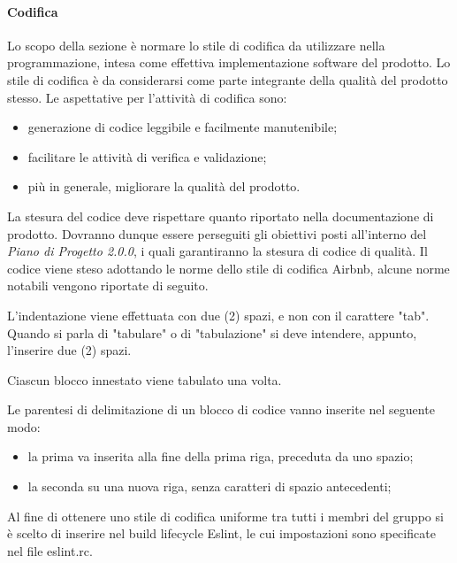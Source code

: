 		\paragraph{Codifica}
	    Lo scopo della sezione è normare lo stile di codifica da utilizzare nella programmazione, intesa come effettiva implementazione software del prodotto. Lo stile di codifica è da considerarsi come parte integrante della qualità del prodotto stesso.
	    Le aspettative per l'attività di codifica sono:
	    \begin{itemize}
	    	\item generazione di codice leggibile e facilmente manutenibile; 
	    	\item facilitare le attività di verifica e validazione;
	    	\item più in generale, migliorare la qualità del prodotto.
	    \end{itemize}
	    La stesura del codice deve rispettare quanto riportato nella documentazione di prodotto. Dovranno dunque essere perseguiti gli obiettivi posti all'interno del \textit{Piano di Progetto 2.0.0}, i quali garantiranno la stesura di codice di qualità. Il codice viene steso adottando le norme dello stile di codifica Airbnb, alcune norme notabili vengono riportate di seguito.
	    
	    L'indentazione viene effettuata con due (2) spazi, e non con il carattere "tab". Quando si parla di "tabulare" o di "tabulazione" si deve intendere, appunto, l'inserire due (2) spazi.
	    
	    Ciascun blocco innestato viene tabulato una volta.
	    
	    Le parentesi di delimitazione di un blocco di codice vanno inserite nel seguente modo:
	    \begin{itemize}
	        \item la prima va inserita alla fine della prima riga, preceduta da uno spazio;
	        \item la seconda su una nuova riga, senza caratteri di spazio antecedenti;
	    \end{itemize}

        Al fine di ottenere uno stile di codifica uniforme tra tutti i membri del gruppo si è scelto di inserire nel build lifecycle Eslint, le cui impostazioni sono specificate nel file eslint.rc.

